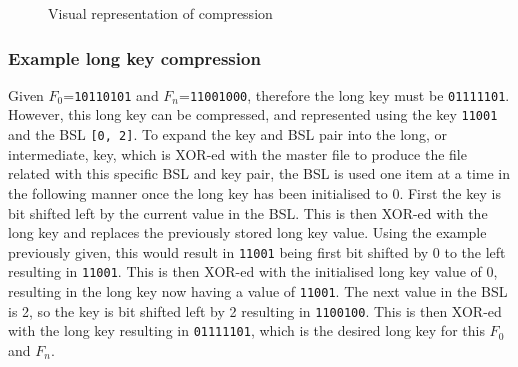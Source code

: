 \documentclass[10pt]{article}
\begin{document}
\begin{figure}[ht]
    \centering
    \caption{Visual representation of compression}
    \label{fig:encodeChart}
\end{figure}

\subsubsection{Example long key compression}\label{subsubsec:example}
Given $F_0$=\texttt{10110101} and $F_n$=\texttt{11001000}, therefore the long key must be \texttt{01111101}. However, this long key can be compressed, and represented using the key \texttt{11001} and the BSL \texttt{[0, 2]}. To expand the key and BSL pair into the long, or intermediate, key, which is XOR-ed with the master file to produce the file related with this specific BSL and key pair, the BSL is used one item at a time in the following manner once the long key has been initialised to 0. First the key is bit shifted left by the current value in the BSL. This is then XOR-ed with the long key and replaces the previously stored long key value. Using the example previously given, this would result in \texttt{11001} being first bit shifted by 0 to the left resulting in \texttt{11001}. This is then XOR-ed with the initialised long key value of 0, resulting in the long key now having a value of \texttt{11001}. The next value in the BSL is 2, so the key is bit shifted left by 2 resulting in \texttt{1100100}. This is then XOR-ed with the long key resulting in \texttt{01111101}, which is the desired long key for this $F_0$ and $F_n$.
\end{document}

